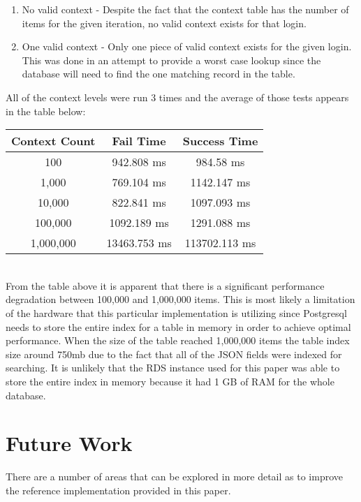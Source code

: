 \documentclass[11pt,journal]{IEEEtran}
\begin{document}
\begin{enumerate}
	\item No valid context - Despite the fact that the context table has the number of items for the given iteration, no valid context exists for that login.
	\item One valid context - Only one piece of valid context exists for the given login.  This was done in an attempt to provide a worst case lookup since the database will need to find the one matching record in the table.
\end{enumerate}

All of the context levels were run 3 times and the average of those tests appears in the table below:\\

\begin{tabular}{|c|c|c|}
	\hline 
	\rule[-1ex]{0pt}{2.5ex} Context Count & Fail Time & Success Time \\ 
	\hline 
	\rule[-1ex]{0pt}{2.5ex} 100 & 942.808 ms & 984.58 ms \\ 
	\hline 
	\rule[-1ex]{0pt}{2.5ex} 1,000 & 769.104 ms & 1142.147 ms \\ 
	\hline 
	\rule[-1ex]{0pt}{2.5ex} 10,000 & 822.841 ms & 1097.093 ms \\ 
	\hline 
	\rule[-1ex]{0pt}{2.5ex} 100,000 & 1092.189 ms & 1291.088 ms \\ 
	\hline 
	\rule[-1ex]{0pt}{2.5ex} 1,000,000 & 13463.753 ms & 113702.113 ms \\ 
	\hline 
\end{tabular}\\

From the table above it is apparent that there is a significant performance degradation between 100,000 and 1,000,000 items.  This is most likely a limitation of the hardware that this particular implementation is utilizing since Postgresql needs to store the entire index for a table in memory in order to achieve optimal performance.  When the size of the table reached 1,000,000 items the table index size around 750mb due to the fact that all of the JSON fields were indexed for searching.  It is unlikely that the RDS instance used for this paper was able to store the entire index in memory because it had 1 GB of RAM for the whole database.

\section{Future Work}
There are a number of areas that can be explored in more detail as to improve the reference implementation provided in this paper.
\end{document}
